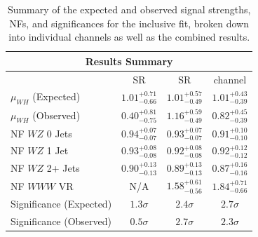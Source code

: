 \begin{table}
  \centering
  \begin{tabular}{l|c|c|c}
    \hline
    \multicolumn{4}{c}{\textbf{Results Summary}}\\
    \hline
     & \zdom{} SR & \zdep{} SR & \wh{} channel\\
    \hline
    $\mu_{WH}$ (Expected) & $1.01^{+0.71}_{-0.66}$ & $1.01^{+0.57}_{-0.49}$ & $1.01^{+0.43}_{-0.39}$ \\
    $\mu_{WH}$ (Observed) & $0.40^{+0.81}_{-0.75}$ & $1.16^{+0.59}_{-0.49}$ & $0.82^{+0.45}_{-0.39}$ \\
    NF $WZ$ 0 Jets & $0.94^{+0.07}_{-0.07}$ & $0.93^{+0.07}_{-0.07}$ & $0.91^{+0.10}_{-0.10}$ \\
    NF $WZ$ 1 Jet & $0.93^{+0.08}_{-0.08}$ & $0.92^{+0.08}_{-0.08}$ & $0.92^{+0.12}_{-0.12}$ \\
    NF $WZ$ 2+ Jets & $0.90^{+0.13}_{-0.13}$ & $0.89^{+0.13}_{-0.13}$ & $0.87^{+0.16}_{-0.16}$ \\
    NF $WWW$ VR & N/A & $1.58^{+0.61}_{-0.56}$ & $1.84^{+0.71}_{-0.66}$ \\
    \hline
    Significance (Expected) & $1.3\sigma$ & $2.4\sigma$ & $2.7\sigma$ \\
    Significance (Observed) & $0.5\sigma$ & $2.7\sigma$ & $2.3\sigma$ \\
    \hline
  \end{tabular}
  \caption{Summary of the expected and observed signal strengths, NFs, and significances for the \wh{} inclusive fit, broken down into individual channels as well as the combined results.}\label{tab:wh_inclusive_results_summary}
\end{table}